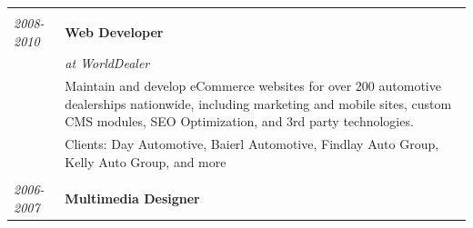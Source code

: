 \documentclass[]{article}
\begin{document}
\begin{multicols}{2}
\begin{longtable}[c]{@{}ll@{}}
\begin{minipage}[t]{0.20\columnwidth}
\strut\end{minipage} &
\begin{minipage}[t]{0.74\columnwidth}\raggedright\strut
\strut\end{minipage}\tabularnewline
\begin{minipage}[t]{0.20\columnwidth}\raggedright\strut
\color{grey} \emph{2008-2010}
\strut\end{minipage} &
\begin{minipage}[t]{0.74\columnwidth}\raggedright\strut
\textbf{Web Developer}
\strut\end{minipage}\tabularnewline
\begin{minipage}[t]{0.20\columnwidth}\raggedright\strut
\strut\end{minipage} &
\begin{minipage}[t]{0.74\columnwidth}\raggedright\strut
\emph{at WorldDealer}
\strut\end{minipage}\tabularnewline
\begin{minipage}[t]{0.20\columnwidth}\raggedright\strut
\strut\end{minipage} &
\begin{minipage}[t]{0.74\columnwidth}\raggedright\strut
\color{grey} Maintain and develop eCommerce websites for over 200
automotive dealerships nationwide, including marketing and mobile sites,
custom CMS modules, SEO Optimization, and 3rd party technologies.
\strut\end{minipage}\tabularnewline
\begin{minipage}[t]{0.20\columnwidth}\raggedright\strut
\strut\end{minipage} &
\begin{minipage}[t]{0.74\columnwidth}\raggedright\strut
Clients: Day Automotive, Baierl Automotive, Findlay Auto Group, Kelly
Auto Group, and more
\strut\end{minipage}\tabularnewline
\begin{minipage}[t]{0.20\columnwidth}\raggedright\strut
\strut\end{minipage} &
\begin{minipage}[t]{0.74\columnwidth}\raggedright\strut
\strut\end{minipage}\tabularnewline
\begin{minipage}[t]{0.20\columnwidth}\raggedright\strut
\color{grey} \emph{2006-2007}
\strut\end{minipage} &
\begin{minipage}[t]{0.74\columnwidth}\raggedright\strut
\textbf{Multimedia Designer}
\strut\end{minipage}\tabularnewline

\end{longtable}
\end{multicols}
\end{document}
